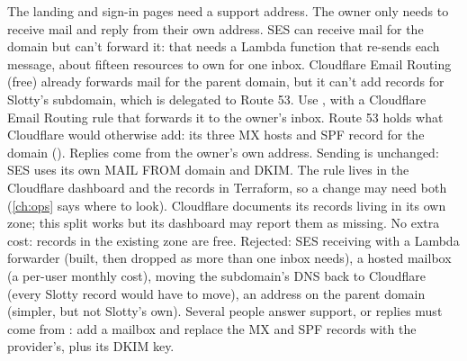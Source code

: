   {The landing and sign-in pages need a support address. The owner only needs to receive mail and
   reply from their own address. SES can receive mail for the domain but can't forward it: that
   needs a Lambda function that re-sends each message, about fifteen resources to own for one
   inbox. Cloudflare Email Routing (free) already forwards mail for the parent domain, but it can't
   add records for Slotty's subdomain, which is delegated to Route 53.}
  {Use , with a Cloudflare Email Routing rule that forwards
   it to the owner's inbox. Route 53 holds what Cloudflare would otherwise add: its three MX hosts
   and SPF record for the domain (). Replies come from the owner's own
   address. Sending is unchanged: SES uses its own MAIL FROM domain and DKIM.}
  {The rule lives in the Cloudflare dashboard and the records in Terraform, so a change may need
   both (\cref{ch:ops} says where to look). Cloudflare documents its records living in its own
   zone; this split works but its dashboard may report them as missing. No extra cost: records in
   the existing zone are free. Rejected: SES receiving with a Lambda forwarder (built, then dropped
   as more than one inbox needs), a hosted mailbox (a per-user monthly cost), moving the
   subdomain's DNS back to Cloudflare (every Slotty record would have to move), an address on the
   parent domain (simpler, but not Slotty's own).}
  {Several people answer support, or replies must come from : add a mailbox and
   replace the MX and SPF records with the provider's, plus its DKIM key.}

